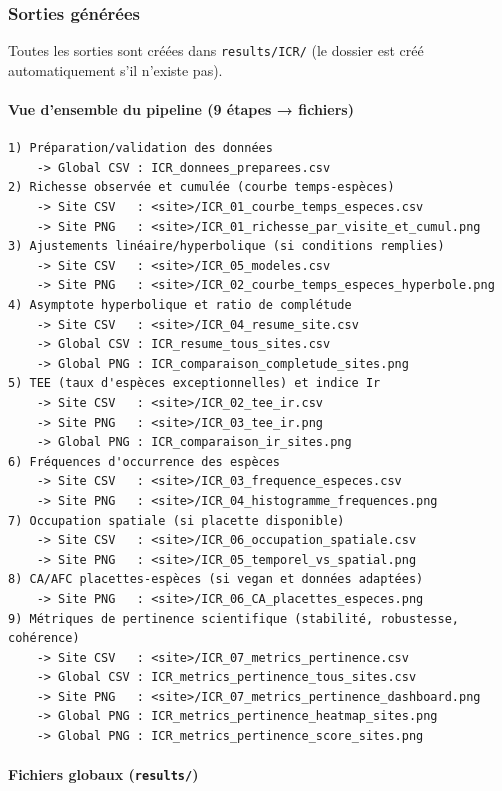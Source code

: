 \subsubsection{Sorties générées}\label{sorties-guxe9nuxe9ruxe9es}

Toutes les sorties sont créées dans \texttt{results/ICR/} (le dossier
est créé automatiquement s'il n'existe pas).

\paragraph{Vue d'ensemble du pipeline (9 étapes →
fichiers)}\label{vue-densemble-du-pipeline-9-uxe9tapes-fichiers}

\begin{verbatim}
1) Préparation/validation des données
    -> Global CSV : ICR_donnees_preparees.csv
2) Richesse observée et cumulée (courbe temps-espèces)
    -> Site CSV   : <site>/ICR_01_courbe_temps_especes.csv
    -> Site PNG   : <site>/ICR_01_richesse_par_visite_et_cumul.png
3) Ajustements linéaire/hyperbolique (si conditions remplies)
    -> Site CSV   : <site>/ICR_05_modeles.csv
    -> Site PNG   : <site>/ICR_02_courbe_temps_especes_hyperbole.png
4) Asymptote hyperbolique et ratio de complétude
    -> Site CSV   : <site>/ICR_04_resume_site.csv
    -> Global CSV : ICR_resume_tous_sites.csv
    -> Global PNG : ICR_comparaison_completude_sites.png
5) TEE (taux d'espèces exceptionnelles) et indice Ir
    -> Site CSV   : <site>/ICR_02_tee_ir.csv
    -> Site PNG   : <site>/ICR_03_tee_ir.png
    -> Global PNG : ICR_comparaison_ir_sites.png
6) Fréquences d'occurrence des espèces
    -> Site CSV   : <site>/ICR_03_frequence_especes.csv
    -> Site PNG   : <site>/ICR_04_histogramme_frequences.png
7) Occupation spatiale (si placette disponible)
    -> Site CSV   : <site>/ICR_06_occupation_spatiale.csv
    -> Site PNG   : <site>/ICR_05_temporel_vs_spatial.png
8) CA/AFC placettes-espèces (si vegan et données adaptées)
    -> Site PNG   : <site>/ICR_06_CA_placettes_especes.png
9) Métriques de pertinence scientifique (stabilité, robustesse, cohérence)
    -> Site CSV   : <site>/ICR_07_metrics_pertinence.csv
    -> Global CSV : ICR_metrics_pertinence_tous_sites.csv
    -> Site PNG   : <site>/ICR_07_metrics_pertinence_dashboard.png
    -> Global PNG : ICR_metrics_pertinence_heatmap_sites.png
    -> Global PNG : ICR_metrics_pertinence_score_sites.png
\end{verbatim}

\paragraph{\texorpdfstring{Fichiers globaux
(\texttt{results/})}{Fichiers globaux (results/)}}\label{fichiers-globaux-results}

